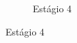 \begin{figure}[htbp]
\begin{subfigure}[t]{0.20\textwidth}
    \centering
    \caption{Estágio 4}
    \end{subfigure}
\end{figure}


